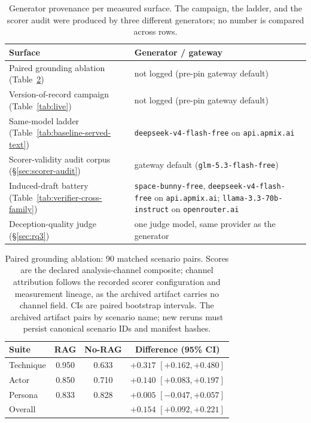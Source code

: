 \begin{table}[t]
\centering
\caption{Generator provenance per measured surface. The campaign, the ladder,
and the scorer audit were produced by three different generators; no number is
compared across rows.}
\label{tab:provenance}
\scriptsize
\setlength{\tabcolsep}{5pt}
\begin{tabular}{p{}>{\raggedright\arraybackslash}p{}}
\toprule
Surface & Generator / gateway \\
\midrule
Paired grounding ablation (Table~\ref{tab:b4})
  & not logged (pre-pin gateway default) \\
Version-of-record campaign (Table~\ref{tab:live})
  & not logged (pre-pin gateway default) \\
Same-model ladder (Table~\ref{tab:baseline-served-text})
  & \texttt{deepseek-v4-flash-free} on \texttt{api.apmix.ai} \\
Scorer-validity audit corpus (\S\ref{sec:scorer-audit})
  & gateway default (\texttt{glm-5.3-flash-free}) \\
Induced-draft battery (Table~\ref{tab:verifier-cross-family})
  & \texttt{space-bunny-free}, \texttt{deepseek-v4-flash-free} on
    \texttt{api.apmix.ai}; \texttt{llama-3.3-70b-instruct} on
    \texttt{openrouter.ai} \\
Deception-quality judge (\S\ref{sec:rq3})
  & one judge model, same provider as the generator \\
\bottomrule
\end{tabular}
\end{table}

\begin{table}[t]
\centering
\caption{Paired grounding ablation: 90 matched scenario pairs. Scores are
the declared analysis-channel composite; channel attribution follows the
recorded scorer configuration and measurement lineage, as the archived
artifact carries no channel field. CIs are paired bootstrap intervals.
The archived artifact pairs by scenario name; new reruns must persist canonical
scenario IDs and manifest hashes.}
\label{tab:b4}
\scriptsize
\setlength{\tabcolsep}{3.5pt}
\begin{tabular}{lccc}
\toprule
Suite & RAG & No-RAG & Difference (95\% CI) \\
\midrule
Technique & 0.950 & 0.633 & $+0.317$ $[+0.162,+0.480]$ \\
Actor & 0.850 & 0.710 & $+0.140$ $[+0.083,+0.197]$ \\
Persona & 0.833 & 0.828 & $+0.005$ $[-0.047,+0.057]$ \\
\midrule
Overall & & & $+0.154$ $[+0.092,+0.221]$ \\
\bottomrule
\end{tabular}
\end{table}

